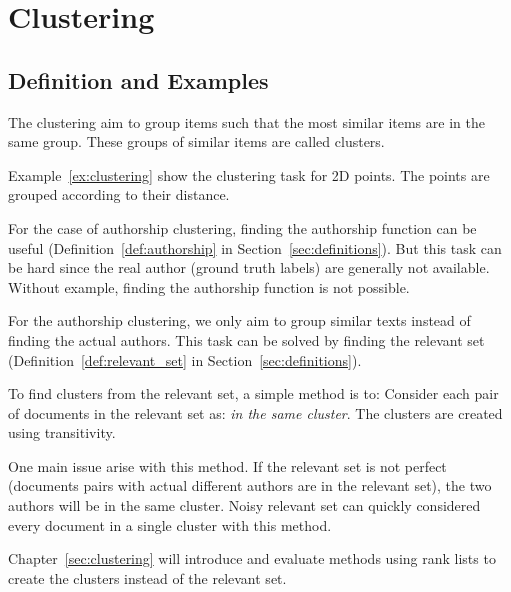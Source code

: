 \section{Clustering~\label{sec:def_clustering}}

\subsection{Definition and Examples}

The clustering aim to group items such that the most similar items are in the same group.
These groups of similar items are called clusters.

Example~\ref{ex:clustering} show the clustering task for 2D points.
The points are grouped according to their distance.

For the case of authorship clustering, finding the authorship function can be useful (Definition~\ref{def:authorship} in Section~\ref{sec:definitions}).
But this task can be hard since the real author (ground truth labels) are generally not available.
Without example, finding the authorship function is not possible.

For the authorship clustering, we only aim to group similar texts instead of finding the actual authors.
This task can be solved by finding the relevant set (Definition~\ref{def:relevant_set} in Section~\ref{sec:definitions}).

To find clusters from the relevant set, a simple method is to:
Consider each pair of documents in the relevant set as: \textit{in the same cluster}.
The clusters are created using transitivity.

One main issue arise with this method.
If the relevant set is not perfect (documents pairs with actual different authors are in the relevant set), the two authors will be in the same cluster.
Noisy relevant set can quickly considered every document in a single cluster with this method.

Chapter~\ref{sec:clustering} will introduce and evaluate methods using rank lists to create the clusters instead of the relevant set.

